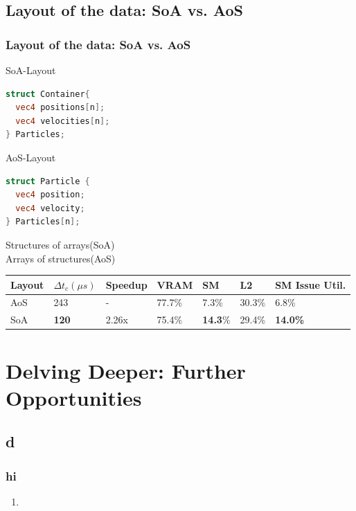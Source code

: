 \documentclass{beamer}
\let\oldcite=\cite
\renewcommand{\cite}[1]{\textcolor[rgb]{.55,.55,.89}{\oldcite{#1}}}
\begin{document}
\subsection{Layout of the data: SoA vs. AoS}
\begin{frame}[fragile]
\frametitle{Layout of the data: SoA vs. AoS}

\begin{minipage}{0.31\textwidth}
  \tiny
\begin{minipage}{0.95\textwidth}
  SoA-Layout
\begin{lstlisting}[language={GLSL},style={GL},basicstyle=\tiny]
struct Container{
  vec4 positions[n];
  vec4 velocities[n];
} Particles;
\end{lstlisting}
\end{minipage}
\begin{minipage}{0.95\textwidth}
  AoS-Layout
\begin{lstlisting}[language={GLSL},style={GL},basicstyle=\tiny]
struct Particle {
  vec4 position;
  vec4 velocity;
} Particles[n];
\end{lstlisting}
\end{minipage}

\end{minipage}
\begin{minipage}{0.64\textwidth}
  \tiny
  
  Structures of arrays(SoA)
  \\
  
  Arrays of structures(AoS)

\end{minipage}
\end{frame}
\begin{frame}
\begin{table}[htbp]
  \begin{tabular}{ | l | l | l | l | l | l | l |}    \hline
    Layout &  $\Delta t_c (\mu s)$	& Speedup &VRAM     & SM     & L2     & SM Issue Util. \\\hline
    AoS         & 243                   & -       &77.7\%   & 7.3\%  & 30.3\% & 6.8\% \\\hline
    SoA         & \textbf{120}                   & 2.26x   &75.4\%   & \textbf{14.3}\% & 29.4\% & \textbf{14.0\%} \\
    \hline
\end{tabular}
\end{table}

  \end{frame}
\section{Delving Deeper: Further Opportunities}

\subsection{d}

\begin{frame}
\frametitle{hi}
  \begin{enumerate}
    \item \cite{MPM:COURSE}
  \end{enumerate}
\end{frame}

\printbibliography
\end{document}
